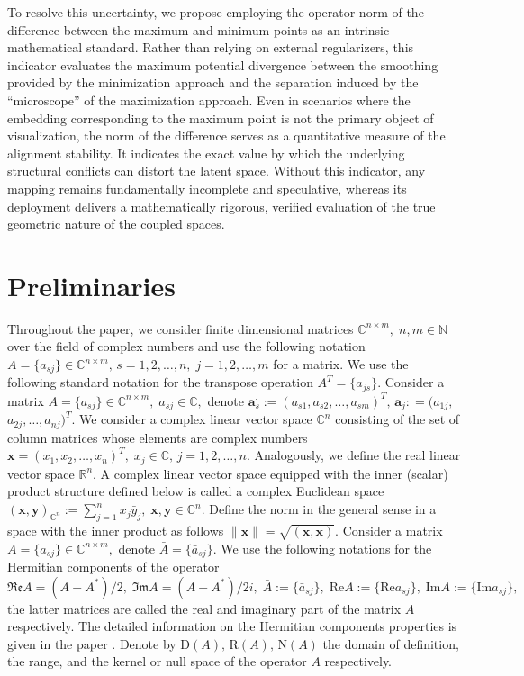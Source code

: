 \documentclass[a4paper,twoside,12pt]{article}
\begin{document}
To resolve this uncertainty, we propose employing   the operator norm of the difference between the maximum and minimum points  as an intrinsic  mathematical
standard. Rather than relying on external regularizers, this indicator evaluates
the maximum potential divergence between the   smoothing   provided by the minimization approach
and the   separation induced by the ``microscope'' of the maximization
approach. Even in scenarios where   the embedding corresponding to the maximum point  is not the primary
object of visualization, the norm of the difference serves as a quantitative measure
of the alignment stability. It indicates the exact value
by which the underlying structural conflicts can distort the latent space. Without
this  indicator, any  mapping  remains fundamentally incomplete and speculative,
whereas its deployment  delivers a mathematically rigorous, verified evaluation of
the true geometric nature of the coupled spaces.





\section{Preliminaries}

Throughout the paper, we consider   finite dimensional matrices  $\mathbb{C}^{n\times m},\;n,m\in \mathbb{N}$ over the field of  complex numbers  and use the following notation $
A =\{a_{sj}\}\in \mathbb{C}^{n\times m}, \,s=1,2,\dots,n,\;j=1,2,\dots,m
$  for a matrix. We use the following standard notation for the   transpose operation
$
A^{T}=\{a_{js}\}.
$
 Consider a matrix
$
A= \{a_{sj}\}\in \mathbb{C} ^{n\times  m},\;a_{sj}\in \mathbb{C},
$
denote
$
\mathbf{a}^{\cdot}_{s }:=
 ( a_{s1}, a_{s2},\dots,a_{sm})^{T},\,\mathbf{a}_{ j }: = (a_{1j},$ $a_{2j},\dots,a_{nj})^{ T }.
$
We consider a complex linear vector space  $\mathbb{C}^{n}$ consisting of the set of column matrices  whose elements are complex numbers $\mathbf{x}=(x_{1},x_{2},\dots,x_{n})^{T},\; x_{j} \in \mathbb{C},\,j=1,2,\dots,n.$
Analogously, we define the real  linear vector space  $\mathbb{R}^{n}.$
A complex linear vector space equipped with the inner (scalar) product structure defined below is called a complex Euclidean space
$
(\mathbf{x},\mathbf{y})_{\mathbb{C}^{n}}:=\sum_{j=1}^{n}x_{j}\bar{y}_{j},\;\mathbf{x},\mathbf{y}\in \mathbb{C}^{ n}.
$
   Define the norm in the general sense  in a space with the inner  product as follows
$
\|\mathbf{x}\|=\sqrt{(\mathbf{x},\mathbf{x})}.
$
Consider a   matrix $A =\{a_{sj}\}\in \mathbb{C}^{n\times m},$ denote $\bar{A} =\{\bar{a}_{sj}\}.$ We use the following notations for the Hermitian components of the operator
$
 \mathfrak{Re}A=(A+A^{\ast})/2,\;\mathfrak{Im}A=(A-A^{\ast})/2i,\;\bar{A}:=\{\bar{a}_{sj} \},\;\mathrm{Re}A:=\{\mathrm{Re}a_{sj} \},\;\mathrm{Im}A:=\{\mathrm{Im}a_{sj} \},
$
 the latter matrices are called  the real and imaginary part of the matrix $A$ respectively.
The detailed information on the Hermitian components properties is given in the paper \cite{Math2024}. Denote by    $    \mathrm{D}   (A),\,   \mathrm{R}   (A),\,\mathrm{N}(A)$      the    domain of definition, the  range,  and the  kernel or   null space  of the  operator $A$ respectively.
\end{document}
